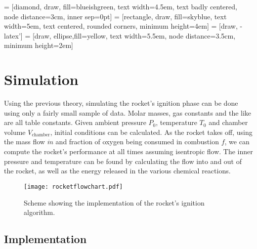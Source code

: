  = [diamond, draw, fill=blueishgreen,
    text width=4.5em, text badly centered, node distance=3cm, inner sep=0pt]
 = [rectangle, draw, fill=skyblue,
    text width=5em, text centered, rounded corners, minimum height=4em]
 = [draw, -latex']
 = [draw, ellipse,fill=yellow, text width=5.5em, node distance=3.5cm,
    minimum height=2em]



\chapter{Simulation}\label{cha:simulations}

  Using the previous theory, simulating the rocket's ignition phase can be done using only a fairly small sample of data. Molar masses, gas constants and the like are all table constants. Given ambient pressure $P_0$, temperature $T_0$ and chamber volume $V_\text{chamber}$, initial conditions can be calculated. As the rocket takes off, using the mass flow $\dot{m}$ and fraction of oxygen being consumed in combustion $f$, we can compute the rocket's performance at all times assuming isentropic flow. The inner pressure and temperature can be found by calculating the flow into and out of the rocket, as well as the energy released in the various chemical reactions.
%
\begin{figure}
	\centering
	\texttt{[image: rocketflowchart.pdf]}
	\caption{Scheme showing the implementation of the rocket's ignition algorithm.}
	\label{fig:flowchart}
\end{figure}


\section{Implementation}

